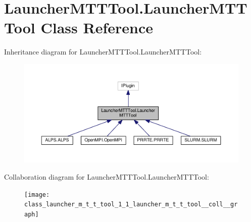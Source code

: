 \hypertarget{class_launcher_m_t_t_tool_1_1_launcher_m_t_t_tool}{\section{Launcher\-M\-T\-T\-Tool.\-Launcher\-M\-T\-T\-Tool Class Reference}
\label{class_launcher_m_t_t_tool_1_1_launcher_m_t_t_tool}
}


Inheritance diagram for Launcher\-M\-T\-T\-Tool.\-Launcher\-M\-T\-T\-Tool\-:
\nopagebreak
\begin{figure}[H]
\begin{center}
\leavevmode
\includegraphics[width=350pt]{class_launcher_m_t_t_tool_1_1_launcher_m_t_t_tool__inherit__graph}
\end{center}
\end{figure}


Collaboration diagram for Launcher\-M\-T\-T\-Tool.\-Launcher\-M\-T\-T\-Tool\-:
\nopagebreak
\begin{figure}[H]
\begin{center}
\leavevmode
\texttt{[image: class\_launcher\_m\_t\_t\_tool\_1\_1\_launcher\_m\_t\_t\_tool\_\_coll\_\_graph]}
\end{center}
\end{figure}
